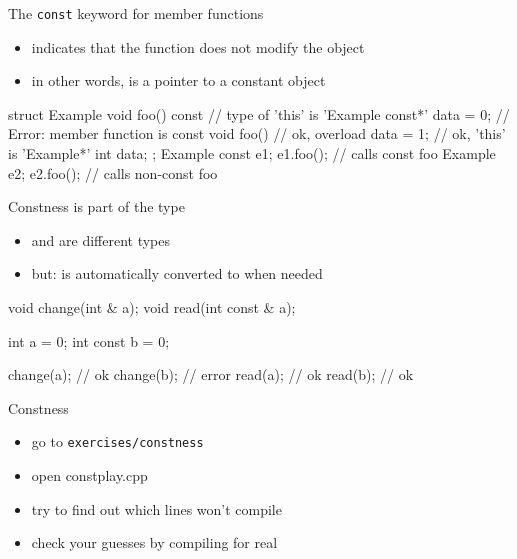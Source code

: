 \begin{frame}[fragile]
  \begin{block}{The \texttt{const} keyword for member functions}
    \begin{itemize}
    \item indicates that the function does not modify the object
    \item in other words,  is a pointer to a constant object
    \end{itemize}
  \end{block}
  \begin{cppcode}
    struct Example {
      void foo() const {
        // type of 'this' is 'Example const*'
        data = 0; // Error: member function is const
      }
      void foo() { // ok, overload
        data = 1;  // ok, 'this' is 'Example*'
      }
      int data;
    };
    Example const e1; e1.foo(); // calls     const foo
    Example       e2; e2.foo(); // calls non-const foo
  \end{cppcode}
\end{frame}

\begin{frame}[fragile]
  \begin{block}{Constness is part of the type}
    \begin{itemize}
    \item {} and  are different types
    \item but:  is automatically converted to  when needed
    \end{itemize}
  \end{block}
  \begin{cppcode}
    void change(int & a);
    void read(int const & a);

    int a = 0;
    int const b = 0;

    change(a); // ok
    change(b); // error
    read(a);   // ok
    read(b);   // ok
  \end{cppcode}
\end{frame}

\begin{frame}[fragile]
  \begin{exercise}{Constness}
    \begin{itemize}
    \item go to \texttt{exercises/constness}
    \item open constplay.cpp
    \item try to find out which lines won't compile
    \item check your guesses by compiling for real
    \end{itemize}
  \end{exercise}
\end{frame}
